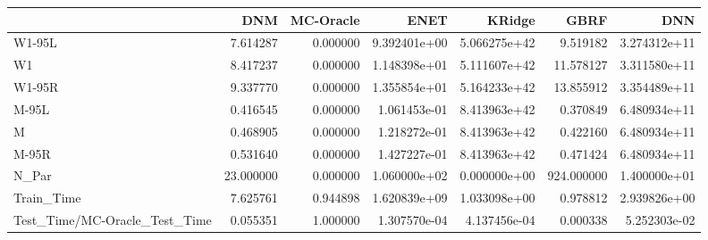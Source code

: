 \begin{tabular}{lrrrrrr}
\toprule
{} &        DNM &  MC-Oracle &          ENET &        KRidge &        GBRF &           DNN \\
\midrule
W1-95L                        &   7.614287 &   0.000000 &  9.392401e+00 &  5.066275e+42 &    9.519182 &  3.274312e+11 \\
W1                            &   8.417237 &   0.000000 &  1.148398e+01 &  5.111607e+42 &   11.578127 &  3.311580e+11 \\
W1-95R                        &   9.337770 &   0.000000 &  1.355854e+01 &  5.164233e+42 &   13.855912 &  3.354489e+11 \\
M-95L                         &   0.416545 &   0.000000 &  1.061453e-01 &  8.413963e+42 &    0.370849 &  6.480934e+11 \\
M                             &   0.468905 &   0.000000 &  1.218272e-01 &  8.413963e+42 &    0.422160 &  6.480934e+11 \\
M-95R                         &   0.531640 &   0.000000 &  1.427227e-01 &  8.413963e+42 &    0.471424 &  6.480934e+11 \\
N\_Par                         &  23.000000 &   0.000000 &  1.060000e+02 &  0.000000e+00 &  924.000000 &  1.400000e+01 \\
Train\_Time                    &   7.625761 &   0.944898 &  1.620839e+09 &  1.033098e+00 &    0.978812 &  2.939826e+00 \\
Test\_Time/MC-Oracle\_Test\_Time &   0.055351 &   1.000000 &  1.307570e-04 &  4.137456e-04 &    0.000338 &  5.252303e-02 \\
\bottomrule
\end{tabular}
